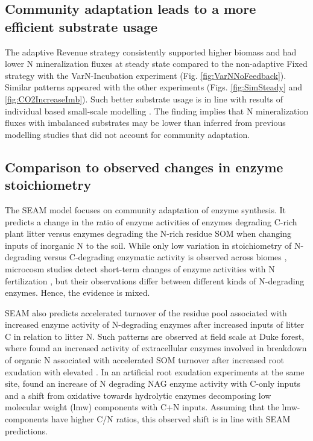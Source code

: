 \subsection{Community adaptation leads to a more efficient substrate usage}
The adaptive Revenue strategy consistently supported higher biomass and had
lower N mineralization fluxes at steady state compared to the non-adaptive
Fixed strategy with the VarN-Incubation experiment (Fig.
\ref{fig:VarNNoFeedback}). Similar patterns appeared with the other experiments
(Figs. \ref{fig:SimSteady} and \ref{fig:CO2IncreaseImb}). Such better substrate
usage is in line with results of individual based small-scale modelling
\citep{Kaiser14}.
The finding implies that N mineralization fluxes with imbalanced substrates may
be lower than inferred from previous modelling studies that did not account for
community adaptation.

\subsection{Comparison to observed changes in enzyme stoichiometry}

The SEAM model focuses on community adaptation of enzyme synthesis. It predicts
a change in the ratio of enzyme activities of enzymes degrading C-rich plant
litter versus enzymes degrading the N-rich residue SOM when changing inputs of
inorganic N to the soil.
While only low variation in stoichiometry of N-degrading versus C-degrading
enzymatic activity is observed across biomes \citep{Sinsabaugh09}, microcosm
studies detect short-term changes of enzyme activities with N fertilization
\citep{Kumar16}, but their observations differ between different kinds of
N-degrading enzymes. Hence, the evidence is mixed.

SEAM also predicts accelerated turnover of the residue pool associated with
increased enzyme activity of N-degrading enzymes after increased inputs of
litter C in relation to litter N.
Such patterns are observed at field scale at Duke forest, where
\citet{Phillips11} found an increased activity of extracellular enzymes involved
in breakdown of organic N associated with accelerated SOM turnover after
increased root exudation with elevated . In an artificial
root exudation experiments at the same site, \citet{Drake13} found an increase of N
degrading NAG enzyme activity with C-only inputs and a shift from oxidative
towards hydrolytic enzymes decomposing low molecular weight (lmw) components
with C+N inputs.
Assuming that the lmw-components have higher C/N ratios, this observed shift
is in line with SEAM predictions.

